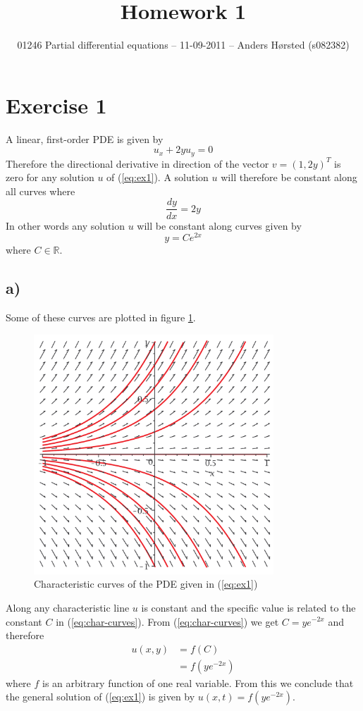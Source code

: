 \documentclass[11pt]{article}
\title{Homework 1}
\author{01246 Partial differential equations -- 11-09-2011 -- Anders Hørsted (s082382)}
\date{} %
\newcommand\myreal{\mathbb{R}}
\begin{document}
\section*{Exercise 1}

A linear, first-order PDE is given by
\begin{equation}\label{eq:ex1}
    u_x + 2yu_y = 0
\end{equation}
Therefore the directional derivative in direction of the vector $v=(1, 2y)^T$ is zero for any solution $u$ of (\ref{eq:ex1}). A solution $u$ will therefore be constant along all curves where
\begin{equation}
    \frac{dy}{dx} = 2y
\end{equation}
In other words any solution $u$ will be constant along curves given by
\begin{equation}\label{eq:char-curves}
    y = Ce^{2x}
\end{equation}
where $C\in\myreal$. 

\subsection*{a)}
Some of these curves are plotted in figure \ref{fig:char-curves}.
\begin{figure}\label{fig:char-curves}
    \centering
    \includegraphics[width=90mm]{characteristic-curves-exercise-1.pdf}
    \caption{Characteristic curves of the PDE given in (\ref{eq:ex1})}
\end{figure}
Along any characteristic line $u$ is constant and the specific value is related to the constant $C$ in (\ref{eq:char-curves}). From (\ref{eq:char-curves}) we get $C=ye^{-2x}$ and therefore
\begin{align}
    u(x, y) &= f(C) \nonumber\\
            &= f(ye^{-2x})\label{eq:ex1-sol}
\end{align}
where $f$ is an arbitrary function of one real variable. From this we conclude that the general solution of (\ref{eq:ex1}) is given by $u(x, t)=f(ye^{-2x})$.
\end{document}
